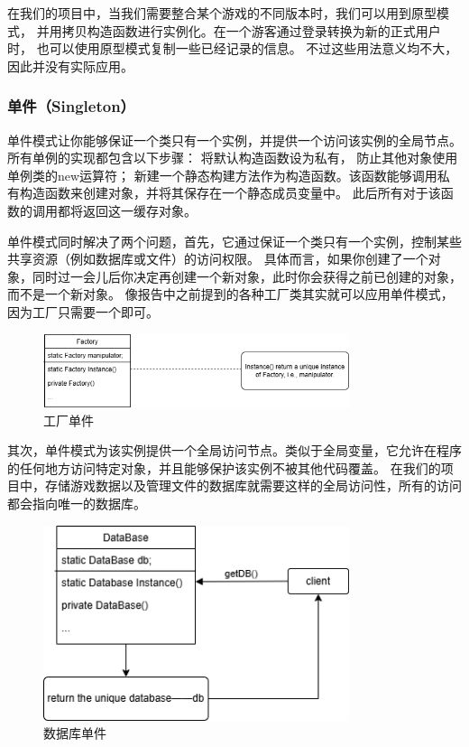\documentclass[12pt]{ctexart} %
\begin{document}
在我们的项目中，当我们需要整合某个游戏的不同版本时，我们可以用到原型模式，
并用拷贝构造函数进行实例化。在一个游客通过登录转换为新的正式用户时，
也可以使用原型模式复制一些已经记录的信息。
不过这些用法意义均不大，因此并没有实际应用。

\subsubsection{单件（Singleton）} 
单件模式让你能够保证一个类只有一个实例，并提供一个访问该实例的全局节点。
所有单例的实现都包含以下步骤：
将默认构造函数设为私有， 防止其他对象使用单例类的new运算符；
新建一个静态构建方法作为构造函数。该函数能够调用私有构造函数来创建对象，并将其保存在一个静态成员变量中。
此后所有对于该函数的调用都将返回这一缓存对象。

单件模式同时解决了两个问题，首先，它通过保证一个类只有一个实例，控制某些共享资源（例如数据库或文件）的访问权限。
具体而言，如果你创建了一个对象，同时过一会儿后你决定再创建一个新对象，此时你会获得之前已创建的对象，而不是一个新对象。
像报告中之前提到的各种工厂类其实就可以应用单件模式，因为工厂只需要一个即可。
\begin{figure}[H]
  \centering
  \includegraphics[width=0.8\textwidth]{singleton_1.png}
  \caption{工厂单件}
\end{figure}

其次，单件模式为该实例提供一个全局访问节点。类似于全局变量，它允许在程序的任何地方访问特定对象，并且能够保护该实例不被其他代码覆盖。
在我们的项目中，存储游戏数据以及管理文件的数据库就需要这样的全局访问性，所有的访问都会指向唯一的数据库。
\begin{figure}[H]
  \centering
  \includegraphics[width=0.8\textwidth]{singleton_2.png}
  \caption{数据库单件}
\end{figure}
\end{document}
